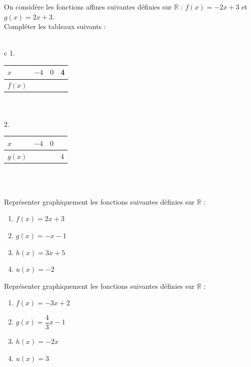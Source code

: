 \begin{exercice}
On considère les fonctions affines suivantes définies sur $\mathbb{R}$ : $f(x)=-2x+3$ et $g(x)=2x+3$.\\
Compléter les tableaux suivants : \\\\
\begin{tabular}{c}
\renewcommand{\arraystretch}{1.33}
1. \begin{tabular}{|p{2cm}|p{1.2cm}|p{1.1cm}|p{1.1cm}|}
 \hline
$x$&$-4$&$0$&4\\\hline
$f(x)$&&&\\\hline
 \end{tabular}\\\\
\renewcommand{\arraystretch}{1.33}
2. \begin{tabular}{|p{2cm}|p{1.2cm}|p{1.1cm}|p{1.1cm}|}
 \hline
$x$&$-4$&$0$&\\\hline
$g(x)$&&&4\\\hline
 \end{tabular}\\\\
\end{tabular}
\end{exercice}

\begin{exercice}
Représenter graphiquement les fonctions suivantes définies sur $\mathbb{R}$ : 
\setlength{\columnseprule}{0pt}
\begin{multicols}{2}
\begin{enumerate}
\item $f(x)=2x+3$
\item $g(x)=-x-1$
\item $h(x)=3x+5$
\item $u(x)=-2$
\end{enumerate}
\end{multicols}
\end{exercice}

\begin{exercice}
Représenter graphiquement les fonctions suivantes définies sur $\mathbb{R}$ : 
\setlength{\columnseprule}{0pt}
\begin{multicols}{2}
\begin{enumerate}
\item $f(x)=-3x+2$
\item $g(x)=\dfrac{4}{3}x-1$
\item $h(x)=-2x$
\item $u(x)=3$
\end{enumerate}
\end{multicols}
\end{exercice}

